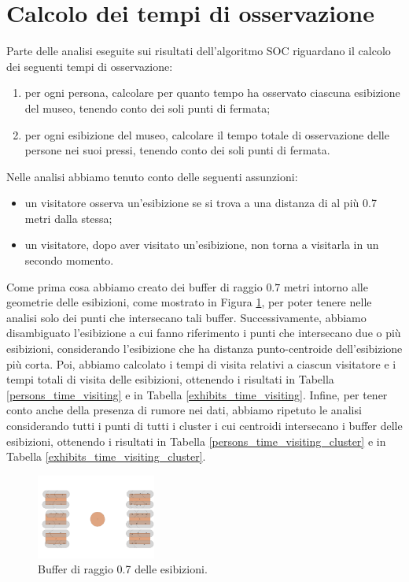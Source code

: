 \documentclass[12pt]{article}
\begin{document}
\section{Calcolo dei tempi di osservazione}\label{calcolo_tempi}
Parte delle analisi eseguite sui risultati dell'algoritmo SOC riguardano il calcolo dei seguenti tempi di osservazione:
\begin{enumerate}
    \item per ogni persona, calcolare per quanto tempo ha osservato ciascuna esibizione del museo, tenendo conto dei soli punti di fermata;
    \item per ogni esibizione del museo, calcolare il tempo totale di osservazione delle persone nei suoi pressi, tenendo conto dei soli punti di fermata.
\end{enumerate}
Nelle analisi abbiamo tenuto conto delle seguenti assunzioni:
\begin{itemize}
    \item un visitatore osserva un'esibizione se si trova a una distanza di al più 0.7 metri dalla stessa;
    \item un visitatore, dopo aver visitato un'esibizione, non torna a visitarla in un secondo momento.
\end{itemize}
Come prima cosa abbiamo creato dei buffer di raggio $0.7$ metri intorno alle geometrie delle esibizioni, come mostrato in Figura \ref{tables_with_exhibits_buffer}, per poter tenere nelle analisi solo dei punti che intersecano tali buffer.
Successivamente, abbiamo disambiguato l'esibizione a cui fanno riferimento i punti che intersecano due o più esibizioni, considerando l'esibizione che ha distanza punto-centroide dell'esibizione più corta.
Poi, abbiamo calcolato i tempi di visita relativi a ciascun visitatore e i tempi totali di visita delle esibizioni, ottenendo i risultati in Tabella \ref{persons_time_visiting} e in Tabella \ref{exhibits_time_visiting}.
Infine, per tener conto anche della presenza di rumore nei dati, abbiamo ripetuto le analisi considerando tutti i punti di tutti i cluster i cui centroidi intersecano i buffer delle esibizioni, ottenendo i risultati in Tabella \ref{persons_time_visiting_cluster} e in Tabella \ref{exhibits_time_visiting_cluster}.

\begin{figure}[htb!]
    \centering
    \includegraphics[width=0.35\textwidth]{images/tables_with_exhibits_buffer.png}
    \caption{Buffer di raggio 0.7 delle esibizioni.}
    \label{tables_with_exhibits_buffer}
\end{figure}
\end{document}

